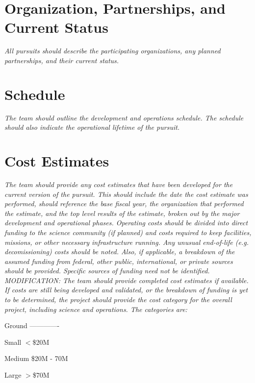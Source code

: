\documentclass[12pt,preprint]{aastex}
\begin{document}
\section{Organization, Partnerships, and Current Status}  
\textit{All pursuits should describe the participating
organizations, any planned partnerships, and their current status.}

\section{Schedule}
\textit{The team should outline the development and operations schedule. The schedule
should also indicate the operational lifetime of the pursuit.}

\section{Cost Estimates}
\textit{The team should provide any cost estimates that have been developed for the
current version of the pursuit. This should include the date the cost estimate was performed,
should reference the base fiscal year, the organization that performed the estimate, and the top
level results of the estimate, broken out by the major development and operational phases.
Operating costs should be divided into direct funding to the science community (if planned) and
costs required to keep facilities, missions, or other necessary infrastructure running. Any
unusual end-of-life (e.g. decomissioning) costs should be noted. Also, if applicable, a
breakdown of the assumed funding from federal, other public, international, or private sources
should be provided. Specific sources of funding need not be identified.
MODIFICATION: The team should provide completed cost estimates if available. If costs are
still being developed and validated, or the breakdown of funding is yet to be determined, the
project should provide the cost category for the overall project, including science and
operations. The categories are:}

Ground
-------------


Small $<$\$20M

Medium \$20M - 70M

Large $>$\$70M


\clearpage
\thispagestyle{empty}
\end{document}
